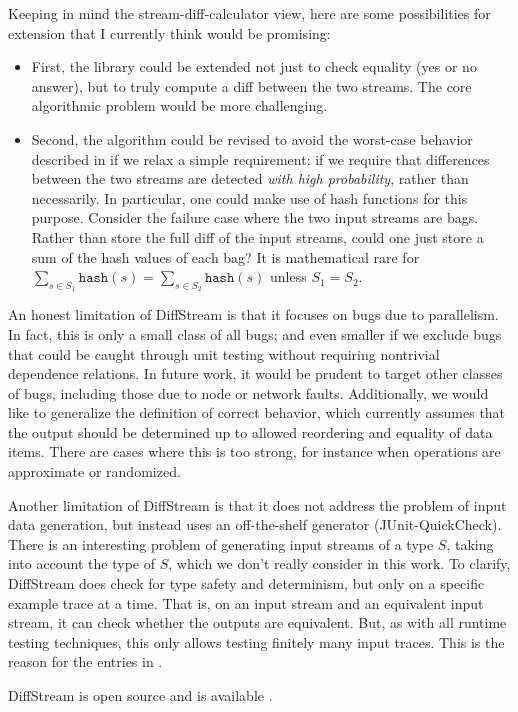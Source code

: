 Keeping in mind the stream-diff-calculator view, here are some possibilities for extension that I currently think would be promising:
\begin{itemize}
  \item First, the library could be extended not just to check equality (yes or no answer), but to truly compute a diff between the two streams. The core algorithmic problem would be more challenging.
  \item Second, the algorithm could be revised to avoid the worst-case behavior described in  if we relax a simple requirement: if we require that differences between the two streams are detected \emph{with high probability}, rather than necessarily. In particular, one could make use of hash functions for this purpose. Consider the failure case where the two input streams are bags. Rather than store the full diff of the input streams, could one just store a sum of the hash values of each bag? It is mathematical rare for $\sum_{s \in S_1} \texttt{hash}(s) = \sum_{s \in S_2} \texttt{hash}(s)$ unless $S_1 = S_2$.
\end{itemize}

An honest limitation of DiffStream is that it focuses on bugs due to parallelism. In fact, this is only a small class of all bugs; and even smaller if we exclude bugs that could be caught through unit testing without requiring nontrivial dependence relations. In future work, it would be prudent to target other classes of bugs, including those due to node or network faults.
Additionally, we would like to generalize the definition of correct behavior, which currently assumes that the output should be determined up to allowed reordering and equality of data items. There are cases where this is too strong, for instance when operations are approximate or randomized.

Another limitation of DiffStream is that it does not address the problem of input data generation, but instead uses an off-the-shelf generator (JUnit-QuickCheck).
There is an interesting problem of generating input streams of a type $S$,
taking into account the type of $S$, which we don't really consider in this work.
To clarify, DiffStream does check for type safety and determinism, but only on a specific example trace at a time. That is, on an input stream and an equivalent input stream, it can check whether the outputs are equivalent.
But, as with all runtime testing techniques, this only allows testing finitely many input traces.
This is the reason for the \Partial{} entries in .

DiffStream is open source and is available .
